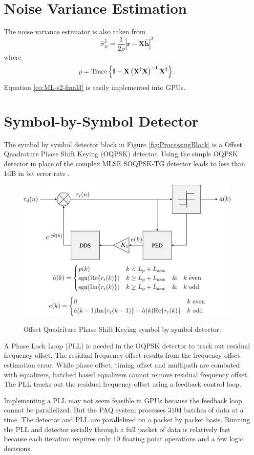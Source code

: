\section{Noise Variance Estimation}
\label{sec:noise_variance_estimation}
The noise variance estimator is also taken from \cite[eq. 9]{rice-afran-saquib-cole-rhodes-moazzami:2014}
\begin{equation}
	\hat{\sigma}_w^2 = \frac{1}{2\rho} \left| \mathbf{r}-\mathbf{X}\hat{\mathbf{h}}\right|^2
	\label{eq:ML-s2-final3}
\end{equation}
where
\begin{equation}
	\rho = {\rm Trace} \left\{ \mathbf{I} -  \mathbf{X}\left(\mathbf{X}^\dag\mathbf{X}\right)^{-1}\mathbf{X}^\dag \right\}.
\end{equation}
Equation \eqref{eq:ML-s2-final3} is easily implemented into GPUs.
	

\section{Symbol-by-Symbol Detector}
\label{sec:oqpsk_detector}
The symbol by symbol detector block in Figure \ref{fig:ProcessingBlock} is a Offset Quadrature Phase Shift Keying (OQPSK) detector.
Using the simple OQPSK detector in place of the complex MLSE SOQPSK-TG detector leads to less than $1$dB in bit error rate \cite{perrins:2013}.
\begin{figure}
	\caption{Offset Quadriture Phase Shift Keying symbol by symbol detector.}
	\centering\includegraphics[width=6in]{figures/systemOverview/OQPSK.pdf}
	\label{fig:OQPSK}
\end{figure}

A Phase Lock Loop (PLL) is needed in the OQPSK detector to track out residual frequency offset.
The residual frequency offset results from the frequency offset estimation error.
While phase offset, timing offset and multipath are combated with equalizers, batched based equalizers cannot remove residual frequency offset.
The PLL tracks out the residual frequency offset using a feedback control loop.

Implementing a PLL may not seem feasible in GPUs because the feedback loop cannot be parallelized.
But the PAQ system processes $3104$ batches of data at a time.
The detector and PLL are parallelized on a packet by packet basis.
Running the PLL and detector serially through a full packet of data is relatively fast because each iteration requires only $10$ floating point operations and a few logic decisions.